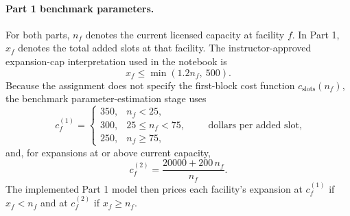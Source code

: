 \documentclass[11pt]{article}
\begin{document}
\paragraph{Part 1 benchmark parameters.}
For both parts, \(n_f\) denotes the current licensed capacity at facility \(f\). In Part 1, \(x_f\) denotes the total added slots at that facility. The instructor-approved expansion-cap interpretation used in the notebook is
\[
x_f \le \min(1.2 n_f,\ 500).
\]
Because the assignment does not specify the first-block cost function \(c_{\text{slots}}(n_f)\), the benchmark parameter-estimation stage uses
\[
c_f^{(1)} =
\begin{cases}
350, & n_f < 25,\\
300, & 25 \le n_f < 75,\\
250, & n_f \ge 75,
\end{cases}
\qquad \text{dollars per added slot,}
\]
and, for expansions at or above current capacity,
\[
c_f^{(2)} = \frac{20000 + 200\,n_f}{n_f}.
\]
The implemented Part 1 model then prices each facility's expansion at \(c_f^{(1)}\) if \(x_f < n_f\) and at \(c_f^{(2)}\) if \(x_f \ge n_f\).
\end{document}
